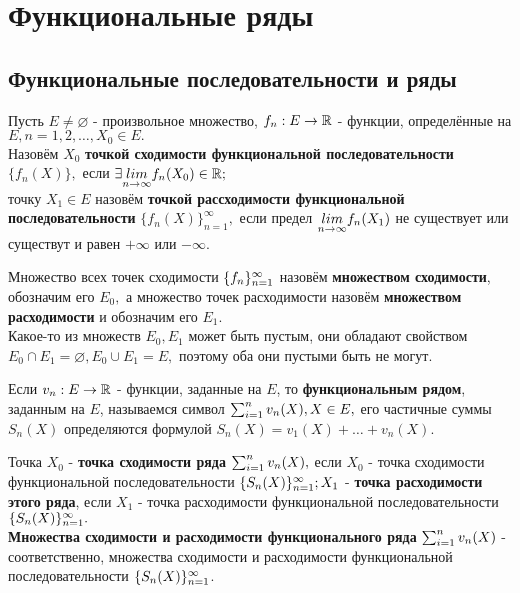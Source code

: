 \documentclass[main]{subfiles}
\begin{document}
\chapter{Функциональные ряды}
\section{Функциональные последовательности и ряды}
\begin{definition} 
    Пусть $E\neq\varnothing$ - произвольное множество, $f_n:E\to{\vR}$ - функции,
     определённые на $E, n=1,2,\ldots, X_0\in E.$\\ Назовём $X_0$
      \textbf{точкой сходимости функциональной последовательности} $\{f_n(X)\},$ если $
       \exists \underset{n\to\infty}{lim}f_n(X_0)\in{\vR};$\\
        точку $X_1\in E$ 
       назовём \textbf{точкой рассходимости функциональной последовательности} $\{f_n(X)\}_{n=1}^\infty,$ 
       если предел $\Lim f_n(X_1)$ не существует или существут и равен $+\infty$ или $-\infty$.
\end{definition}
\begin{definition}
        Множество всех точек сходимости $\fnn$ назовём \textbf{множеством сходимости}, обозначим его $E_0,$ 
        а множество точек расходимости назовём \textbf{множеством расходимости} и обозначим его $E_1$. \\
        Какое-то из множеств $E_0, E_1$ может быть пустым, они обладают свойством
         $E_0\cap E_1=\varnothing, E_0\cup E_1=E,$
         поэтому оба они пустыми быть не могут. \end{definition}
         \begin{definition}
Если $v_n:E\to {\vR}$ - функции, заданные на $E$, то \textbf{функциональным рядом}, заданным на $E$,
 называемся символ $\sumn v_n(X), X\in E,$ его частичные суммы $S_n(X)$ определяются формулой
  $S_n(X)=v_1(X)+\dots+v_n(X).$ \end{definition}
  \begin{definition}
Точка $X_0$ - \textbf{точка сходимости ряда} $\sumn v_n(X),$ если $X_0$ - 
точка сходимости функциональной последовательности $\fnn[S_n(X)];
 X_1$ -
 \textbf{точка расходимости этого ряда}, если $X_1$ - точка расходимости 
 функциональной последовательности $\fnn[S_n(X)].$\\ 
 \textbf{Множества сходимости и расходимости функционального ряда}
  $\sumn v_n(X)$ - соответственно, множества сходимости и расходимости
   функциональной последовательности $\fnn[S_n(X)]$. 
\end{definition}
\end{document}
